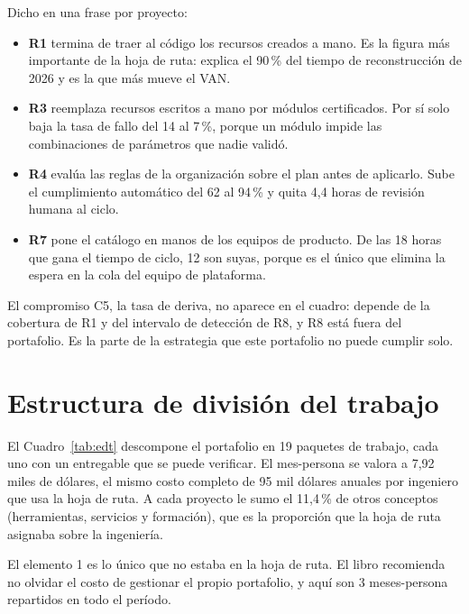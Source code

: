 \documentclass[11pt,letterpaper]{article}
\newcommand{\pct}{\,\%}
\begin{document}
Dicho en una frase por proyecto:

\begin{itemize}
\item \textbf{R1} termina de traer al código los recursos creados a mano. Es la
  figura más importante de la hoja de ruta: explica el 90\pct{} del tiempo de
  reconstrucción de 2026 y es la que más mueve el VAN.
\item \textbf{R3} reemplaza recursos escritos a mano por módulos certificados.
  Por sí solo baja la tasa de fallo del 14 al 7\pct, porque un módulo impide las
  combinaciones de parámetros que nadie validó.
\item \textbf{R4} evalúa las reglas de la organización sobre el plan antes de
  aplicarlo. Sube el cumplimiento automático del 62 al 94\pct{} y quita 4,4
  horas de revisión humana al ciclo.
\item \textbf{R7} pone el catálogo en manos de los equipos de producto. De las
  18 horas que gana el tiempo de ciclo, 12 son suyas, porque es el único que
  elimina la espera en la cola del equipo de plataforma.
\end{itemize}

El compromiso C5, la tasa de deriva, no aparece en el cuadro: depende de la
cobertura de R1 y del intervalo de detección de R8, y R8 está fuera del
portafolio. Es la parte de la estrategia que este portafolio no puede cumplir
solo.

\section{Estructura de división del trabajo}
\label{sec:edt}

El Cuadro~\ref{tab:edt} descompone el portafolio en 19 paquetes de trabajo, cada
uno con un entregable que se puede verificar. El mes-persona se valora a 7,92
miles de dólares, el mismo costo completo de 95 mil dólares anuales por
ingeniero que usa la hoja de ruta. A cada proyecto le sumo el 11,4\pct{} de
otros conceptos (herramientas, servicios y formación), que es la proporción que
la hoja de ruta asignaba sobre la ingeniería.

El elemento 1 es lo único que no estaba en la hoja de ruta. El libro recomienda
no olvidar el costo de gestionar el propio portafolio, y aquí son 3
meses-persona repartidos en todo el período.
\end{document}
